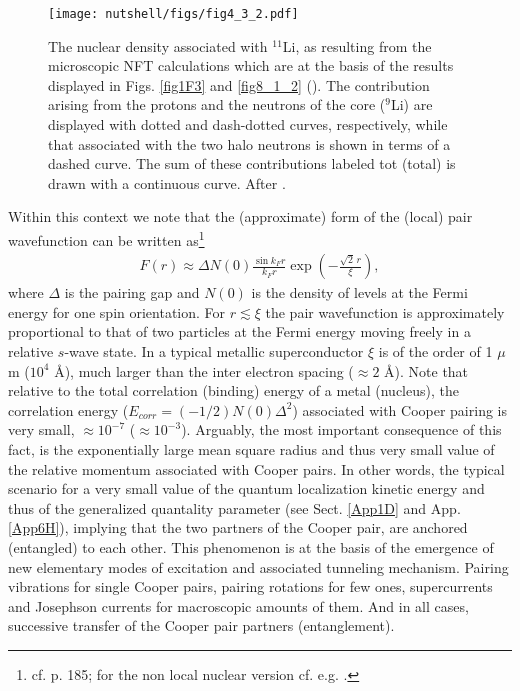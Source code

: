 \begin{figure}
\centerline{\texttt{[image: nutshell/figs/fig4\_3\_2.pdf]}}
\caption{The nuclear density associated with $^{11}$Li, as resulting from the microscopic NFT calculations which are at the basis of the results displayed in Figs. \ref{fig1F3} and \ref{fig8_1_2} (\cite{Barranco:01}). The contribution arising from the protons and the neutrons of the core ($^{9}$Li) are displayed with  dotted and dash-dotted curves, respectively, while that associated with the two halo neutrons is shown in terms of a dashed curve. The sum of these  contributions  labeled tot (total) is drawn with a continuous curve. After \cite{Broglia:19}.}\label{fig3.2.2}
\end{figure}
Within this context we note that the (approximate) form of the (local) pair wavefunction can be written as\footnote{cf. \cite{Leggett:06} p. 185; for the non local nuclear version cf. e.g. \cite{Broglia:83c}.}
\begin{align}\label{eq4.3.2}
F(r)\approx\Delta N(0)\frac{\sin k_F r}{k_Fr}\exp\left(-\frac{\sqrt{2}\,r}{\xi}\right),
\end{align}
where $\Delta$ is the pairing gap and $N(0)$ is the density of levels at the Fermi energy for one spin orientation. For $r\lesssim\xi$ the pair wavefunction is approximately proportional to that of two particles at the Fermi energy moving freely in a relative $s$-wave state. In a typical metallic superconductor $\xi$ is of the order of 1 $\mu$m ($10^4$ \AA), much larger than the inter electron spacing ($\approx 2$ \AA). Note that relative to the total correlation (binding) energy of a metal (nucleus), the correlation energy ($E_{corr}=(-1/2)N(0)\Delta^2$) associated with Cooper pairing is very small, $\approx 10^{-7}$ ($\approx10^{-3}$). Arguably, the most important consequence of this fact, is the exponentially large mean square radius and thus very small value of the relative momentum associated with Cooper pairs. In other words, the typical scenario for a very small value of the quantum localization kinetic energy and thus of the generalized quantality parameter  (see Sect. \ref{App1D} and App. \ref{App6H}), implying that the two partners of the Cooper pair, are  anchored (entangled) to each other. This phenomenon is at the basis  of the emergence of new elementary modes of excitation and associated tunneling mechanism. Pairing vibrations for single Cooper pairs, pairing rotations for few ones, supercurrents and Josephson currents for macroscopic amounts of them. And in all cases, successive transfer of the Cooper pair partners (entanglement).



